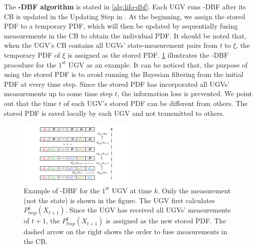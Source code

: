 	The \textbf{\proto-DBF algorithm} is stated in \cref{alg:lifo-dbf}.
	Each UGV runs \proto-DBF after its CB is updated in the Updating Step in .
	At the beginning, we assign the stored PDF to a temporary PDF, which will then be updated by sequentially fusing measurements in the CB to obtain the individual PDF.
	It should be noted that, when the UGV's CB contains all UGVs' state-measurement pairs from $t$ to $\xi$, the temporary PDF of $\xi$ is assigned as the stored PDF.
	\cref{fig:LIFO-DBF} illustrates the \proto-DBF procedure for the $1^\text{st}$ UGV as an example.
	It can be noticed that, the purpose of using the stored PDF is to avoid running the Bayesian filtering from the initial PDF at every time step. 
	Since the stored PDF has incorporated all UGVs' measurements up to some time step $t$, the information loss is prevented. %
	We point out that the time $t$ of each UGV's stored PDF can be different from others.
	The stored PDF is saved locally by each UGV and not transmitted to others.
	
	\begin{figure}%
		\centering
		\includegraphics[width=0.50\textwidth]{figures/fifo-dbf}
		\caption{Example of \proto-DBF for the $1^\text{st}$ UGV at time $k$. 
			Only the measurement (not the state) is shown in the figure.
			The UGV first calculates $ P^1_{tmp}(X_{t+1})$. 
			Since the UGV has received all UGVs' measurements of $t+1$, the $ P^1_{tmp}(X_{t+1})$ is assigned as the new stored PDF. 
			The dashed arrow on the right shows the order to fuse measurements in the CB.}
		\label{fig:LIFO-DBF}
	\end{figure}			
	
